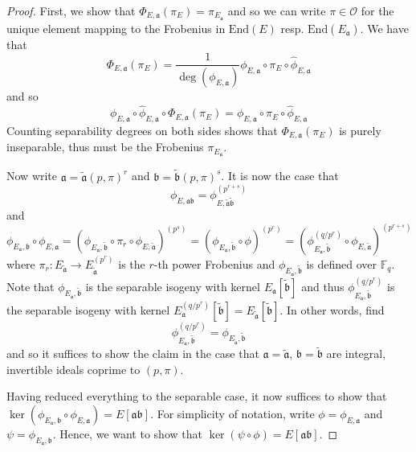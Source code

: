 \documentclass{scrartcl}
\newcommand{\F}{\mathbb{F}}
\newcommand{\End}{\mathrm{End}}
\renewcommand{\a}{\mathfrak{a}}
\renewcommand{\b}{\mathfrak{b}}
\renewcommand{\O}{\mathcal{O}}
\theoremstyle{definition}
\begin{document}
\begin{proof}
    First, we show that $\Phi_{E, \a}(\pi_E) = \pi_{E_\a}$ and so we can write $\pi \in \O$ for the unique element mapping to the Frobenius in $\End(E)$ resp. $\End(E_\a)$.
    We have that
    \begin{equation*}
        \Phi_{E, \a}(\pi_E) = \frac 1 {\deg(\phi_{E, \a})} \phi_{E, \a} \circ \pi_E \circ \hat{\phi}_{E, \a}
    \end{equation*}
    and so
    \begin{equation*}
        \phi_{E, \a} \circ \hat{\phi}_{E, \a} \circ \Phi_{E, \a}(\pi_E) = \phi_{E, \a} \circ \pi_E \circ \hat{\phi}_{E, \a}
    \end{equation*}
    Counting separability degrees on both sides shows that $\Phi_{E, \a}(\pi_E)$ is purely inseparable, thus must be the Frobenius $\pi_{E_\a}$.
    
    Now write $\a = \tilde{\a} (p, \pi)^r$ and $\b = \tilde{\b} (p, \pi)^s$.
    It is now the case that
    \begin{equation*}
        \phi_{E, \a\b} = \phi_{E, \tilde{\a} \tilde{\b}}^{(p^{r + s})}
    \end{equation*}
    and
    \begin{equation*}
        \phi_{E_\a, \b} \circ \phi_{E, \a} = (\phi_{E_\a, \tilde{\b}} \circ \pi_r \circ \phi_{E, \tilde{\a}})^{(p^s)} = (\phi_{E_\a, \tilde{\b}} \circ \phi)^{(p^r)} = (\phi_{E_\a, \tilde{\b}}^{(q/p^r)} \circ \phi_{E, \tilde{\a}})^{(p^{r + s})}
    \end{equation*}
    where $\pi_r: E_{\tilde{\a}} \to E_{\tilde{\a}}^{(p^r)}$ is the $r$-th power Frobenius and $\phi_{E_\a, \tilde{\b}}$ is defined over $\F_q$.
    Note that $\phi_{E_\a, \tilde{\b}}$ is the separable isogeny with kernel $E_\a[\tilde{\b}]$ and thus $\phi_{E_\a, \tilde{\b}}^{(q/p^r)}$ is the separable isogeny with kernel $E_{\a}^{(q/p^r)}[\tilde{\b}] = E_{\tilde{\a}}[\tilde{\b}]$.
    In other words, find
    \begin{equation*}
        \phi_{E_\a, \tilde{\b}}^{(q/p^r)} = \phi_{E_{\tilde{\a}}, \tilde{\b}}
    \end{equation*}
    and so it suffices to show the claim in the case that $\a = \tilde{\a}$, $\b = \tilde{\b}$ are integral, invertible ideals coprime to $(p, \pi)$.

    Having reduced everything to the separable case, it now suffices to show that $\ker(\phi_{E_\a, \b} \circ \phi_{E, \a}) = E[\a\b]$.
    For simplicity of notation, write $\phi = \phi_{E, \a}$ and $\psi = \phi_{E_\a, \b}$.
    Hence, we want to show that $\ker(\psi \circ \phi) = E[\a\b]$.


\end{proof}
\end{document}
